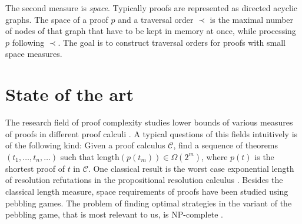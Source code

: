 The second measure is \emph{space}.
Typically proofs are represented as directed acyclic graphs.
The space of a proof $p$ and a traversal order $\prec$ is the maximal number of nodes of that graph that have to be kept in memory at once, while processing $p$ following $\prec$.
The goal is to construct traversal orders for proofs with small space measures.

%
%


\section{State of the art}

The research field of proof complexity studies lower bounds of various measures of proofs in different proof calculi \cite{Arora2009,Beame1998a,Cook1979}. A typical questions of this fields intuitively is of the following kind: Given a proof calculus $\mathcal{C}$, find a sequence of theorems $(t_1,\ldots, t_n, \ldots)$ such that $\mathrm{length}(p(t_m)) \in \Omega(2^m)$, where $p(t)$ is the shortest proof of $t$ in $\mathcal{C}$.
%
%
One classical result is the worst case exponential length of resolution refutations in the propositional resolution calculus \cite{Arora2009}.
Besides the classical length measure, space requirements of proofs have been studied \cite{Ben-Sasson2002,Esteban2001,Hopcroft1977,Nordstroem2013,Sethi1975} using pebbling games.
The problem of finding optimal strategies in the variant of the pebbling game, that is most relevant to us, is NP-complete \cite{Sethi1975}.

